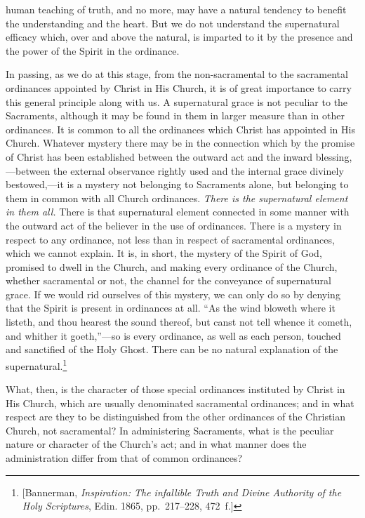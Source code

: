 \documentclass[english,]{book}
\begin{document}
human teaching of truth, and no more, may have a natural tendency to benefit the understanding and the heart. But we do not understand the supernatural efficacy which, over and above the natural, is imparted to it by the presence and the power of the Spirit in the ordinance.

In passing, as we do at this stage, from the non-sacramental to the sacramental ordinances appointed by Christ in His Church, it is of great importance to carry this general principle along with us. A supernatural grace is not peculiar to the Sacraments, although it may be found in them in larger measure than in other ordinances. It is common to all the ordinances which Christ has appointed in His Church. Whatever mystery there may be in the connection which by the promise of Christ has been established between the outward act and the inward blessing,---between the external observance rightly used and the internal grace divinely bestowed,---it is a mystery not belonging to Sacraments alone, but belonging to them in common with all Church ordinances. \emph{There is the supernatural element in them all.} There is that supernatural element connected in some manner with the outward act of the believer in the use of ordinances. There is a mystery in respect to any ordinance, not less than in respect of sacramental ordinances, which we cannot explain. It is, in short, the mystery of the Spirit of God, promised to dwell in the Church, and making every ordinance of the Church, whether sacramental or not, the channel for the conveyance of supernatural grace. If we would rid ourselves of this mystery, we can only do so by denying that the Spirit is present in ordinances at all. ``As the wind bloweth where it listeth, and thou hearest the sound thereof, but canst not tell whence it cometh, and whither it goeth,''---so is every ordinance, as well as each person, touched and sanctified of the Holy Ghost. There can be no natural explanation of the supernatural.\footnote{{[}Bannerman, \emph{Inspiration: The infallible Truth and Divine Authority of the Holy Scriptures}, Edin. 1865, pp.~217--228, 472~f.{]}}

What, then, is the character of those special ordinances instituted by Christ in His Church, which are usually denominated sacramental ordinances; and in what respect are they to be distinguished from the other ordinances of the Christian Church, not sacramental? In administering Sacraments, what is the peculiar nature or character of the Church's act; and in what manner does the administration differ from that of common ordinances?
\end{document}

